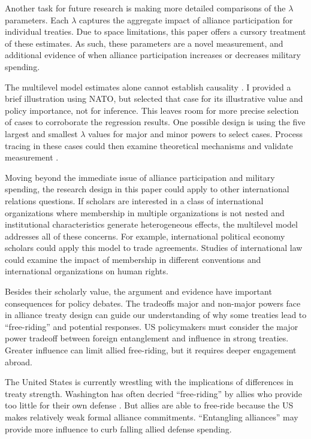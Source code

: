 \documentclass[12pt]{article}
\begin{document}
Another task for future research is making more detailed comparisons of the $\lambda$ parameters. 
Each $\lambda$ captures the aggregate impact of alliance participation for individual treaties.
Due to space limitations, this paper offers a cursory treatment of these estimates. 
As such, these parameters are a novel measurement, and additional evidence of when alliance participation increases or decreases military spending. 


The multilevel model estimates alone cannot establish causality \citep{Seawright2016}. 
I provided a brief illustration using NATO, but selected that case for its illustrative value and policy importance, not for inference. 
This leaves room for more precise selection of cases to corroborate the regression results. 
One possible design is using the five largest and smallest $\lambda$ values for major and minor powers to select cases. 
Process tracing in these cases could then examine theoretical mechanisms and validate measurement \citep{Seawright2016}. 


Moving beyond the immediate issue of alliance participation and military spending, the research design in this paper could apply to other international relations questions.
If scholars are interested in a class of international organizations where membership in multiple organizations is not nested and institutional characteristics generate heterogeneous effects, the multilevel model addresses all of these concerns.
For example, international political economy scholars could apply this model to trade agreements. 
Studies of international law could examine the impact of membership in different conventions and international organizations on human rights. 


Besides their scholarly value, the argument and evidence have important consequences for policy debates. 
The tradeoffs major and non-major powers face in alliance treaty design can guide our understanding of why some treaties lead to ``free-riding'' and potential responses. 
US policymakers must consider the major power tradeoff between foreign entanglement and influence in strong treaties. 
Greater influence can limit allied free-riding, but it requires deeper engagement abroad. 


The United States is currently wrestling with the implications of differences in treaty strength. 
Washington has often decried ``free-riding'' by allies who provide too little for their own defense \citep{Lanoszka2015}. 
But allies are able to free-ride because the US makes relatively weak formal alliance commitments. 
``Entangling alliances'' may provide more influence to curb falling allied defense spending. 
\end{document}
